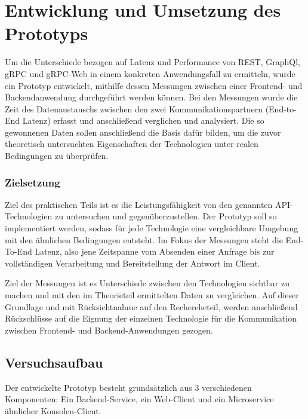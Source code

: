 \chapter{Entwicklung und Umsetzung des Prototyps}
\label{chap:intro}
\chapterstart

Um die Unterschiede bezogen auf Latenz und Performance von REST, GraphQl, gRPC und gRPC-Web in einem konkreten Anwendungsfall zu ermitteln, wurde ein Prototyp entwickelt, mithilfe dessen Messungen zwischen einer Frontend- und Backendanwendung durchgeführt werden können. 
Bei den Messungen wurde die Zeit des Datenaustauschs zwischen den zwei Kommunikationspartnern (End-to-End Latenz) erfasst und anschließend verglichen und analysiert.
Die so gewonnenen Daten sollen anschließend die Basis dafür bilden, 
um die zuvor theoretisch untersuchten Eigenschaften der Technologien unter realen Bedingungen zu überprüfen.

\subsection*{Zielsetzung}
Ziel des praktischen Teils ist es die Leistungsfähigkeit von den genannten API-Technologien zu untersuchen und gegenüberzustellen. Der Prototyp soll so implementiert werden, sodass für jede Technologie eine vergleichbare Umgebung mit den ähnlichen Bedingungen entsteht. 
Im Fokus der Messungen steht die End-To-End Latenz, also jene Zeitspanne vom Absenden einer Anfrage bis zur vollständigen Verarbeitung und Bereitstellung der Antwort im Client. 

Ziel der Messungen ist es Unterschiede zwischen den Technologien sichtbar zu machen und mit den im Theorieteil ermittelten Daten zu vergleichen.
Auf dieser Grundlage und mit Rücksichtnahme auf den Rechercheteil, werden anschließend Rückschlüsse auf die Eignung der einzelnen Technologie für die Kommunikation zwischen Frontend- und Backend-Anwendungen gezogen.


\section{Versuchsaufbau}
Der entwickelte Prototyp besteht grundsätzlich aus 3 verschiedenen Komponenten: 
Ein Backend-Service, ein Web-Client und ein Microservice ähnlicher Konsolen-Client.

